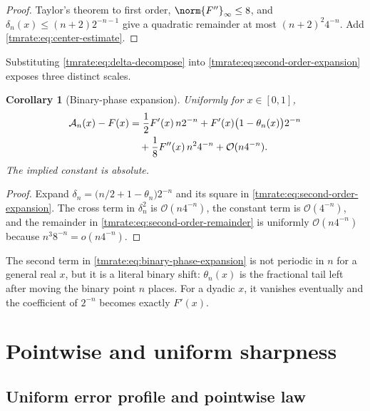 \documentclass[11pt,oneside]{article}
\newtheorem{corollary}[theorem]{Corollary}
\theoremstyle{definition}
\theoremstyle{remark}
\newcommand{\bigO}{\mathcal O}
\begin{document}
\begin{proof}
Taylor's theorem to first order, $\norm{F''}_\infty\le8$, and
$\delta_n(x)\le(n+2)2^{-n-1}$ give a quadratic remainder at most
$(n+2)^2 4^{-n}$.  Add \eqref{tmrate:eq:center-estimate}.
\end{proof}

Substituting \eqref{tmrate:eq:delta-decompose} into
\eqref{tmrate:eq:second-order-expansion} exposes three distinct scales.

\begin{corollary}[Binary-phase expansion]
\label{tmrate:cor:binary-phase-expansion}
Uniformly for $x\in[0,1]$,
\begin{align}
 \mathcal A_n(x)-F(x)
 &=\frac12F'(x)\,n2^{-n}
   +F'(x)\bigl(1-\theta_n(x)\bigr)2^{-n} \notag\\
 &\quad+\frac18F''(x)\,n^2 4^{-n}
   +\bigO(n4^{-n}).                                       \label{tmrate:eq:binary-phase-expansion}
\end{align}
The implied constant is absolute.
\end{corollary}

\begin{proof}
Expand
$\delta_n=\bigl(n/2+1-\theta_n\bigr)2^{-n}$ and its square in
\eqref{tmrate:eq:second-order-expansion}.  The cross term in $\delta_n^2$ is
$\bigO(n4^{-n})$, the constant term is $\bigO(4^{-n})$, and the remainder in
\eqref{tmrate:eq:second-order-remainder} is uniformly $\bigO(n4^{-n})$ because
$n^3 8^{-n}=o(n4^{-n})$.
\end{proof}

The second term in \eqref{tmrate:eq:binary-phase-expansion} is not periodic in $n$ for
a general real $x$, but it is a literal binary shift: $\theta_n(x)$ is the
fractional tail left after moving the binary point $n$ places.  For a dyadic
$x$, it vanishes eventually and the coefficient of $2^{-n}$ becomes exactly
$F'(x)$.

\section{Pointwise and uniform sharpness}
\label{tmrate:sec:sharpness}

\subsection{Uniform error profile and pointwise law}
\end{document}
